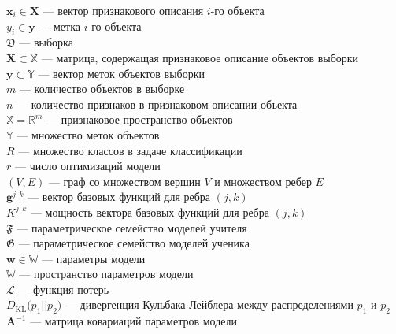 \noindent$\textbf{x}_i \in \textbf{X}$ --- вектор признакового описания $i$-го объекта\\
$y_i \in \mathbf{y}$ --- метка $i$-го объекта\\
$\mathfrak{D}$ --- выборка\\
$\textbf{X} \subset \mathbb{X}$ --- матрица, содержащая признаковое описание объектов выборки\\
$\textbf{y} \subset \mathbb{Y}$ --- вектор меток объектов выборки\\
$m$ --- количество объектов в выборке\\
$n$ --- количество признаков в признаковом описании объекта\\
$\mathbb{X} = \mathbb{R}^m$ --- признаковое пространство объектов\\
$\mathbb{Y}$ --- множество меток объектов\\
$R$ --- множество классов в задаче классификации\\
$r$ --- число оптимизаций модели\\
$(V,E)$ --- граф со множеством вершин $V$ и множеством ребер $E$\\
$\mathbf{g}^{j,k}$ --- вектор базовых функций для ребра $(j,k)$\\
$K^{j,k}$ --- мощность вектора базовых функций для ребра $(j,k)$\\
$\mathfrak{F}$ --- параметрическое семейство моделей учителя\\
$\mathfrak{G}$ --- параметрическое семейство моделей ученика\\
$\textbf{w} \in \mathbb{W}$ --- параметры модели\\
$\mathbb{W}$ --- пространство параметров модели\\
$\mathcal{L}$ --- функция потерь\\
$D_\text{KL}\bigl(p_1 || p_2\bigr)$ --- дивергенция Кульбака-Лейблера  между распределениями $p_1$ и $p_2$
$\textbf{A}^{-1}$ --- матрица ковариаций параметров модели\\